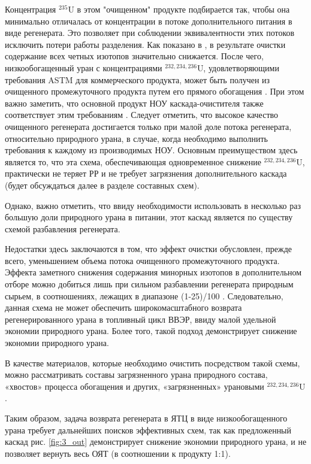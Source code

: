 Концентрация $^{235}$U в этом "очищенном" продукте подбирается так, чтобы она минимально отличалась от концентрации в потоке дополнительного питания в виде регенерата.
Это позволяет при соблюдении эквивалентности этих потоков исключить потери работы разделения.
Как показано в \cite{palkinSeparationUraniumIsotopes2010}, в результате очистки содержание всех четных изотопов значительно снижается. После чего, низкообогащенный уран с концентрациями $^{232,234,236}$U, удовлетворяющими требования ASTM для коммерческого продукта, может быть получен из очищенного промежуточного продукта путем его прямого обогащения \cite{shopenSposobPolucheniyaRazbavitelya2008}.
При этом важно заметить, что основной продукт НОУ каскада-очистителя также соответствует этим требованиям \cite{palkinSeparationUraniumIsotopes2010}. Следует отметить, что высокое качество очищенного регенерата достигается только при малой доле потока регенерата, относительно природного урана, в случае, когда необходимо выполнить требования к каждому из производимых НОУ.
Основным преимуществом здесь является то, что эта схема, обеспечивающая одновременное снижение $^{232,234,236}$U, практически не теряет РР и не требует загрязнения дополнительного каскада (будет обсуждаться далее в разделе составных схем).

Однако, важно отметить, что ввиду необходимости использовать в несколько раз большую доли природного урана в питании, этот каскад является по существу схемой разбавления регенерата.

Недостатки здесь заключаются в том, что эффект очистки обусловлен, прежде всего, уменьшением объема потока очищенного промежуточного продукта. Эффекта заметного снижения содержания минорных изотопов в дополнительном отборе можно добиться лишь при сильном разбавлении регенерата природным сырьем, в соотношениях, лежащих в диапазоне (1-25)/100 \cite{palkinSeparationUraniumIsotopes2010, smirnovKaskadnyeShemyZadachah2012}.
Следовательно, данная схема не может обеспечить широкомасштабного возврата регенерированного урана в топливный цикл ВВЭР, ввиду малой удельной экономии природного урана.
Более того, такой подход демонстрирует снижение экономии природного урана.

В качестве материалов, которые необходимо очистить посредством такой схемы, можно рассматривать составы загрязненного урана природного состава, «хвостов» процесса обогащения и других, «загрязненных» урановыми $^{232,234,236}$U \cite{palkinSeparationUraniumIsotopes2010}. 

Таким образом, задача возврата регенерата в ЯТЦ в виде низкообогащенного урана требует дальнейших поисков эффективных схем, так как предложенный каскад рис. \ref{fig:3_out} демонстрирует снижение экономии природного урана, и не позволяет вернуть весь ОЯТ (в соотношении к продукту 1:1).

